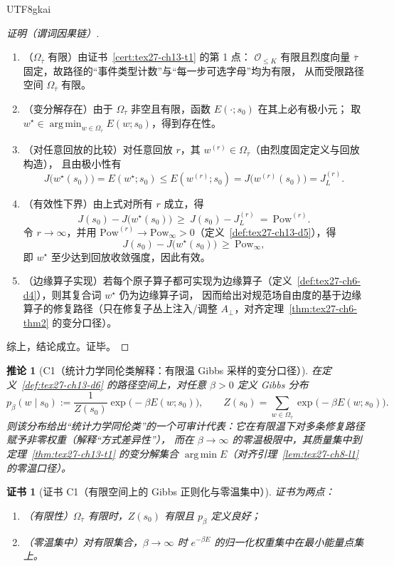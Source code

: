 \documentclass[12pt]{article}
\newtheorem{corollary}{推论}[section]
\newtheorem{Certificate}{证书}[section]
\begin{document}
\begin{CJK*}{UTF8}{gkai}
\begin{proof}[证明（谓词因果链）]
\begin{enumerate}
  \item（$\Omega_{\overline{\tau}}$ 有限）由证书~\ref{cert:tex27-ch13-t1} 的第 1 点：
  $\mathcal{O}_{\le K}$ 有限且烈度向量 $\overline{\tau}$ 固定，故路径的“事件类型计数”与“每一步可选字母”均为有限，
  从而受限路径空间 $\Omega_{\overline{\tau}}$ 有限。
  \item（变分解存在）由于 $\Omega_{\overline{\tau}}$ 非空且有限，函数 $E(\cdot;s_0)$ 在其上必有极小元；
  取 $w^\star\in\operatorname*{arg\,min}_{w\in\Omega_{\overline{\tau}}}E(w;s_0)$，得到存在性。
  \item（对任意回放的比较）对任意回放 $r$，其 $w^{(r)}\in\Omega_{\overline{\tau}}$（由烈度固定定义与回放构造），
  且由极小性有
  \[
    J\bigl(w^\star(s_0)\bigr)=E(w^\star;s_0)\le E(w^{(r)};s_0)=J\bigl(w^{(r)}(s_0)\bigr)=J^{(r)}_L.
  \]
  \item（有效性下界）由上式对所有 $r$ 成立，得
  \[
    J(s_0)-J\bigl(w^\star(s_0)\bigr)\ \ge\ J(s_0)-J^{(r)}_L\ =\ \mathrm{Pow}^{(r)}.
  \]
  令 $r\to\infty$，并用 $\mathrm{Pow}^{(r)}\to\mathrm{Pow}_\infty>0$（定义~\ref{def:tex27-ch13-d5}），得
  \[
    J(s_0)-J\bigl(w^\star(s_0)\bigr)\ \ge\ \mathrm{Pow}_\infty,
  \]
  即 $w^\star$ 至少达到回放收敛强度，因此有效。
  \item（边缘算子实现）若每个原子算子都可实现为边缘算子（定义~\ref{def:tex27-ch6-d4}），则其复合词 $w^\star$ 仍为边缘算子词，
  因而给出对规范场自由度的基于边缘算子的修复路径（只在修复子丛上注入/调整 $A_{\perp}$，对齐定理~\ref{thm:tex27-ch6-thm2} 的变分口径）。
\end{enumerate}
综上，结论成立。证毕。
\end{proof}

\begin{corollary}[C1（统计力学同伦类解释：有限温 Gibbs 采样的变分口径）]
\label{cor:tex27-ch13-c1}
在定义~\ref{def:tex27-ch13-d6} 的路径空间上，对任意 $\beta>0$ 定义 Gibbs 分布
\[
  p_\beta(w\mid s_0)
  :=\frac{1}{Z(s_0)}\exp\bigl(-\beta E(w;s_0)\bigr),
  \qquad
  Z(s_0)=\sum_{w\in\Omega_{\overline{\tau}}}\exp\bigl(-\beta E(w;s_0)\bigr).
\]
则该分布给出“统计力学同伦类”的一个可审计代表：它在有限温下对多条修复路径赋予非零权重（解释“方式差异性”），
而在 $\beta\to\infty$ 的零温极限中，其质量集中到定理~\ref{thm:tex27-ch13-t1} 的变分解集合 $\operatorname*{arg\,min}E$（对齐引理~\ref{lem:tex27-ch8-l1} 的零温口径）。
\end{corollary}

\begin{Certificate}[证书 C1（有限空间上的 Gibbs 正则化与零温集中）]
\label{cert:tex27-ch13-c1}
证书为两点：
\begin{enumerate}
  \item（有限性）$\Omega_{\overline{\tau}}$ 有限时，$Z(s_0)$ 有限且 $p_\beta$ 定义良好；
  \item（零温集中）对有限集合，$\beta\to\infty$ 时 $e^{-\beta E}$ 的归一化权重集中在最小能量点集上。
\end{enumerate}
\end{Certificate}


\end{CJK*}
\end{document}
